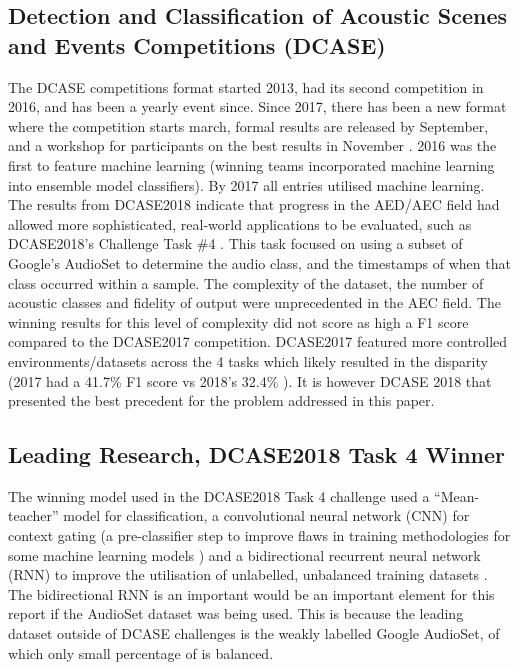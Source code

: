 \documentclass{UoNMCHA}
\numberwithin{equation}{section}
\begin{document}
\subsection{Detection and Classification of Acoustic Scenes and Events Competitions (DCASE)}
The DCASE competitions format started 2013, had its second competition in 2016, and has been a yearly event since. Since 2017, there has been a new format where the competition starts march, formal results are released by September, and a workshop for participants on the best results in November \cite{2018Schedule}. 2016 was the first to feature machine learning (winning teams incorporated machine learning into ensemble model classifiers). By 2017 all entries utilised machine learning. The results from DCASE2018 indicate that progress in the AED/AEC field had allowed more sophisticated, real-world applications to be evaluated, such as DCASE2018's Challenge Task \#4 \cite{2018n}. This task focused on using a subset of Google's AudioSet to determine the audio class, and the timestamps of when that class occurred within a sample. The complexity of the dataset, the number of acoustic classes and fidelity of output were unprecedented in the AEC field. The winning results for this level of complexity did not score as high a F1 score compared to the DCASE2017 competition. DCASE2017 featured more controlled environments/datasets across the 4 tasks which likely resulted in the disparity (2017 had a 41.7\% F1 score \cite{2017results} vs 2018’s 32.4\% \cite{2018n}). It is however DCASE 2018 that presented the best precedent for the problem addressed in this paper.

\subsection{Leading Research, DCASE2018 Task 4 Winner}
The winning model used in the DCASE2018 Task 4 challenge used a “Mean-teacher” model for classification, a convolutional neural network (CNN) for context gating (a pre-classifier step to improve flaws in training methodologies for some machine learning models \cite{Yan16}) and a bidirectional recurrent neural network (RNN) to improve the utilisation of unlabelled, unbalanced training datasets \cite{winners}. The bidirectional RNN is an important would be an important element for this report if the AudioSet dataset was being used. This is because the leading dataset outside of DCASE challenges is the weakly labelled Google AudioSet, of which only small percentage of is balanced.
\end{document}
